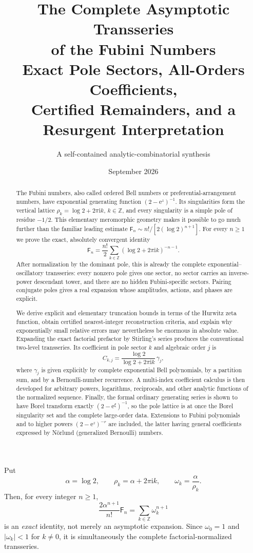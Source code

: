 \documentclass[11pt,a4paper]{article}
\title{\Huge\bfseries The Complete Asymptotic Transseries\\[2mm]
       of the Fubini Numbers\\[4mm]
       \Large Exact Pole Sectors, All-Orders Coefficients,\\
       Certified Remainders, and a Resurgent Interpretation}
\author{A self-contained analytic-combinatorial synthesis}
\date{September 2026}
\theoremstyle{definition}
\theoremstyle{remark}
\newcommand{\Fub}{\mathsf F}
\newcommand{\e}{\mathrm e}
\newcommand{\ii}{\mathrm i}
\newcommand{\abs}[1]{\left|#1\right|}
\newcommand{\Z}{\mathbb Z}
\begin{document}
\maketitle

\begin{abstract}
The Fubini numbers, also called ordered Bell numbers or preferential-arrangement
numbers, have exponential generating function
\(
 (2-\e^z)^{-1}
\).
Its singularities form the vertical lattice
\(
 \rho_k=\log 2+2\pi\ii k
\), \(k\in\Z\), and every singularity is a simple pole of residue
\(-1/2\).  This elementary meromorphic geometry makes it possible to go much
further than the familiar leading estimate
\(
 \Fub_n\sim n!/[2(\log 2)^{n+1}]
\).
For every \(n\ge1\) we prove the exact, absolutely convergent identity
\[
 \Fub_n=\frac{n!}{2}\sum_{k\in\Z}
          (\log 2+2\pi\ii k)^{-n-1}.
\]
After normalization by the dominant pole, this is already the complete
exponential--oscillatory transseries: every nonzero pole gives one sector, no
sector carries an inverse-power descendant tower, and there are no hidden
Fubini-specific sectors.  Pairing conjugate poles gives a real expansion whose
amplitudes, actions, and phases are explicit.

We derive explicit and elementary truncation bounds in terms of the Hurwitz zeta
function, obtain certified nearest-integer reconstruction criteria, and explain
why exponentially small relative errors may nevertheless be enormous in
absolute value.  Expanding the exact factorial prefactor by Stirling's series
produces the conventional two-level transseries.  Its coefficient in pole
sector \(k\) and algebraic order \(j\) is
\[
 C_{k,j}=\frac{\log 2}{\log 2+2\pi\ii k}\,\gamma_j,
\]
where \(\gamma_j\) is given explicitly by complete exponential Bell
polynomials, by a partition sum, and by a Bernoulli-number recurrence.  A
multi-index coefficient calculus is then developed for arbitrary powers,
logarithms, reciprocals, and other analytic functions of the normalized
sequence.  Finally, the formal ordinary generating series is shown to have
Borel transform exactly \((2-\e^\xi)^{-1}\), so the pole lattice is at once the
Borel singularity set and the complete large-order data.  Extensions to Fubini
polynomials and to higher powers \((2-\e^z)^{-r}\) are included, the latter
having general coefficients expressed by N\"orlund (generalized Bernoulli)
numbers.
\end{abstract}

\clearpage
\begin{masterbox}
Put
\[
 \alpha=\log 2,\qquad \rho_k=\alpha+2\pi\ii k,\qquad
 \omega_k=\frac{\alpha}{\rho_k}.
\]
Then, for every integer \(n\ge1\),
\[
 \boxed{\displaystyle
 \frac{2\alpha^{n+1}}{n!}\Fub_n
 =\sum_{k\in\Z}\omega_k^{n+1}}
\]
is an \emph{exact} identity, not merely an asymptotic expansion.  Since
\(\omega_0=1\) and \(\abs{\omega_k}<1\) for \(k\ne0\), it is simultaneously
the complete factorial-normalized transseries.
\end{masterbox}
\end{document}
